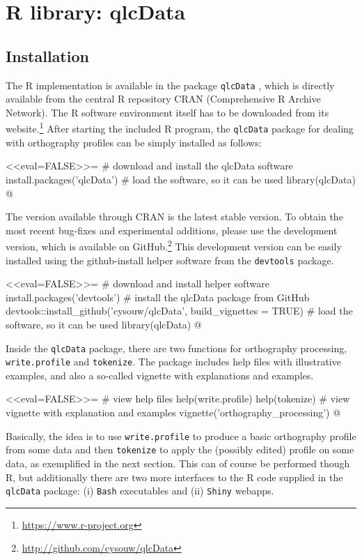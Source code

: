 \section{R library: qlcData}
\label{r-implementation}

\subsection*{Installation}

The R implementation is available in the package \texttt{qlcData} \citep{Cysouw2018}, which is 
directly available from the central R repository CRAN (Comprehensive R Archive 
Network). The R software environment itself has to be downloaded from its 
website.\footnote{\url{https://www.r-project.org}} After starting the included 
R program, the \texttt{qlcData} package for dealing with orthography profiles can be 
simply installed as follows:

<<eval=FALSE>>=
# download and install the qlcData software
install.packages('qlcData') 
# load the software, so it can be used
library(qlcData) 
@

The version available through CRAN is the latest stable version.
To obtain the most recent bug-fixes and experimental additions, please use the
development version, which is available on
GitHub.\footnote{\url{http://github.com/cysouw/qlcData}} This development
version can be easily installed using the github-install helper software from the
\texttt{devtools} package.

<<eval=FALSE>>=
# download and install helper software
install.packages('devtools') 
# install the qlcData package from GitHub
devtools::install_github('cysouw/qlcData', build_vignettes = TRUE)
# load the software, so it can be used 
library(qlcData) 
@

Inside the \texttt{qlcData} package, there are two functions for
orthography processing, \texttt{write.profile} and \texttt{tokenize}. The package includes
help files with illustrative examples, and also a so-called vignette with
explanations and examples.

<<eval=FALSE>>=
# view help files
help(write.profile)
help(tokenize)
# view vignette with explanation and examples
vignette('orthography_processing')
@

Basically, the idea is to use \texttt{write.profile} to produce a
basic orthography profile from some data and then \texttt{tokenize} to apply the
(possibly edited) profile on some data, as exemplified in the next section. This
can of course be performed though R, but additionally there are two more
interfaces to the R code supplied in the \texttt{qlcData} package: (i) \texttt{Bash}
executables and (ii) \texttt{Shiny} webapps.

